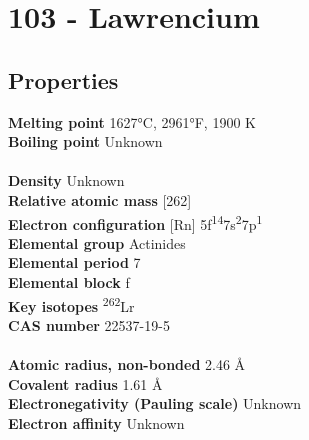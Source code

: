 \section{103 - Lawrencium}
\label{sec:elem-lawrencium}
\subsection{Properties}
\textbf{Melting point} 1627°C, 2961°F, 1900 K\\
\textbf{Boiling point} Unknown\\
\\
\textbf{Density} Unknown\\
\textbf{Relative atomic mass} [262]\\
\textbf{Electron configuration} [Rn] 5f\textsuperscript{14}7s\textsuperscript{2}7p\textsuperscript{1}\\
\textbf{Elemental group} Actinides\\
\textbf{Elemental period} 7\\
\textbf{Elemental block} f\\
\textbf{Key isotopes} \textsuperscript{262}Lr\\
\textbf{CAS number} 22537-19-5\\
\\
\textbf{Atomic radius, non-bonded} 2.46 Å\\
\textbf{Covalent radius} 1.61 Å\\
\textbf{Electronegativity (Pauling scale)} Unknown\\
\textbf{Electron affinity} Unknown\\